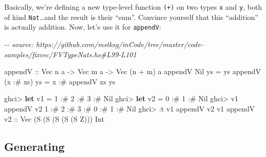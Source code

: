 \documentclass[]{article}
\newenvironment{Shaded}{}{}
\newcommand{\CommentTok}[1]{\textcolor[rgb]{0.38,0.63,0.69}{\textit{#1}}}
\newcommand{\DataTypeTok}[1]{\textcolor[rgb]{0.56,0.13,0.00}{#1}}
\newcommand{\DecValTok}[1]{\textcolor[rgb]{0.25,0.63,0.44}{#1}}
\newcommand{\KeywordTok}[1]{\textcolor[rgb]{0.00,0.44,0.13}{\textbf{#1}}}
\newcommand{\NormalTok}[1]{#1}
\newcommand{\OperatorTok}[1]{\textcolor[rgb]{0.40,0.40,0.40}{#1}}
\newcommand{\OtherTok}[1]{\textcolor[rgb]{0.00,0.44,0.13}{#1}}
\begin{document}
Basically, we're defining a new type-level function \texttt{(+)} on two types
\texttt{x} and \texttt{y}, both of kind \texttt{Nat}\ldots and the result is
their ``sum''. Convince yourself that this ``addition'' is actually addition.
Now, let's use it for \texttt{appendV}:

\begin{Shaded}
\begin{Highlighting}[]
\CommentTok{{-}{-} source: https://github.com/mstksg/inCode/tree/master/code{-}samples/fixvec/FVTypeNats.hs\#L99{-}L101}

\OtherTok{appendV ::} \DataTypeTok{Vec}\NormalTok{ n a }\OtherTok{{-}>} \DataTypeTok{Vec}\NormalTok{ m a }\OtherTok{{-}>} \DataTypeTok{Vec}\NormalTok{ (n }\OperatorTok{+}\NormalTok{ m) a}
\NormalTok{appendV }\DataTypeTok{Nil}\NormalTok{       ys }\OtherTok{=}\NormalTok{ ys}
\NormalTok{appendV (x }\OperatorTok{:\#}\NormalTok{ xs) ys }\OtherTok{=}\NormalTok{ x }\OperatorTok{:\#}\NormalTok{ appendV xs ys}
\end{Highlighting}
\end{Shaded}

\begin{Shaded}
\begin{Highlighting}[]
\NormalTok{ghci}\OperatorTok{>} \KeywordTok{let}\NormalTok{ v1 }\OtherTok{=} \DecValTok{1} \OperatorTok{:\#} \DecValTok{2} \OperatorTok{:\#} \DecValTok{3} \OperatorTok{:\#} \DataTypeTok{Nil}
\NormalTok{ghci}\OperatorTok{>} \KeywordTok{let}\NormalTok{ v2 }\OtherTok{=} \DecValTok{0} \OperatorTok{:\#} \DecValTok{1} \OperatorTok{:\#} \DataTypeTok{Nil}
\NormalTok{ghci}\OperatorTok{>}\NormalTok{ v1 }\OtherTok{\textasciigrave{}appendV\textasciigrave{}}\NormalTok{ v2}
\DecValTok{1} \OperatorTok{:\#} \DecValTok{2} \OperatorTok{:\#} \DecValTok{3} \OperatorTok{:\#} \DecValTok{0} \OperatorTok{:\#} \DecValTok{1} \OperatorTok{:\#} \DataTypeTok{Nil}
\NormalTok{ghci}\OperatorTok{>} \OperatorTok{:}\NormalTok{t v1 }\OtherTok{\textasciigrave{}appendV\textasciigrave{}}\NormalTok{ v2}
\NormalTok{v1 }\OtherTok{\textasciigrave{}appendV\textasciigrave{} v2 ::} \DataTypeTok{Vec}\NormalTok{ (}\DataTypeTok{S}\NormalTok{ (}\DataTypeTok{S}\NormalTok{ (}\DataTypeTok{S}\NormalTok{ (}\DataTypeTok{S}\NormalTok{ (}\DataTypeTok{S} \DataTypeTok{Z}\NormalTok{))) }\DataTypeTok{Int}
\end{Highlighting}
\end{Shaded}

\hypertarget{generating}{%
\subsection{Generating}\label{generating}}
\end{document}
